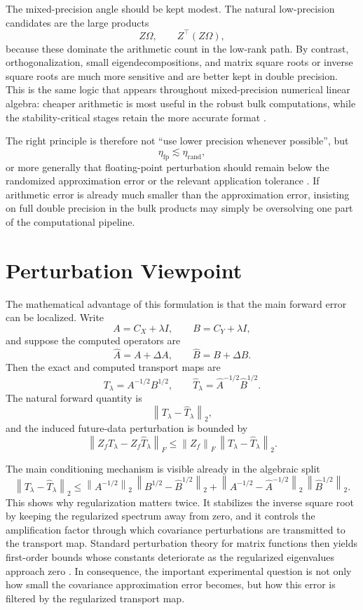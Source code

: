 \documentclass[12pt,a4paper]{article}
\newcommand{\norm}[1]{\left\lVert #1 \right\rVert}
\begin{document}
The mixed-precision angle should be kept modest. The natural low-precision candidates are the large products
\[
	Z\Omega, \qquad Z^\top(Z\Omega),
\]
because these dominate the arithmetic count in the low-rank path. By contrast, orthogonalization, small eigendecompositions, and matrix square roots or inverse square roots are much more sensitive and are better kept in double precision. This is the same logic that appears throughout mixed-precision numerical linear algebra: cheaper arithmetic is most useful in the robust bulk computations, while the stability-critical stages retain the more accurate format \cite{higham2022mixed}.

The right principle is therefore not ``use lower precision whenever possible'', but
\[
	\eta_{\mathrm{fp}} \lesssim \eta_{\mathrm{rand}},
\]
or more generally that floating-point perturbation should remain below the randomized approximation error or the relevant application tolerance \cite{carson2026balancing}. If arithmetic error is already much smaller than the approximation error, insisting on full double precision in the bulk products may simply be oversolving one part of the computational pipeline.

\section{Perturbation Viewpoint}

The mathematical advantage of this formulation is that the main forward error can be localized. Write
\[
	A = C_X + \lambda I, \qquad B = C_Y + \lambda I,
\]
and suppose the computed operators are
\[
	\widehat A = A + \Delta A, \qquad \widehat B = B + \Delta B.
\]
Then the exact and computed transport maps are
\[
	T_\lambda = A^{-1/2}B^{1/2},
	\qquad
	\widehat T_\lambda = \widehat A^{-1/2}\widehat B^{1/2}.
\]
The natural forward quantity is
\[
	\norm{T_\lambda - \widehat T_\lambda}_2,
\]
and the induced future-data perturbation is bounded by
\[
	\norm{Z_f T_\lambda - Z_f \widehat T_\lambda}_F
	\le
	\norm{Z_f}_F\, \norm{T_\lambda - \widehat T_\lambda}_2.
\]

The main conditioning mechanism is visible already in the algebraic split
\[
	\norm{T_\lambda - \widehat T_\lambda}_2
	\le
	\norm{A^{-1/2}}_2\,\norm{B^{1/2} - \widehat B^{1/2}}_2
	+
	\norm{A^{-1/2} - \widehat A^{-1/2}}_2\,\norm{\widehat B^{1/2}}_2.
\]
This shows why regularization matters twice. It stabilizes the inverse square root by keeping the regularized spectrum away from zero, and it controls the amplification factor through which covariance perturbations are transmitted to the transport map. Standard perturbation theory for matrix functions then yields first-order bounds whose constants deteriorate as the regularized eigenvalues approach zero \cite{higham2008functions}. In consequence, the important experimental question is not only how small the covariance approximation error becomes, but how this error is filtered by the regularized transport map.
\end{document}
